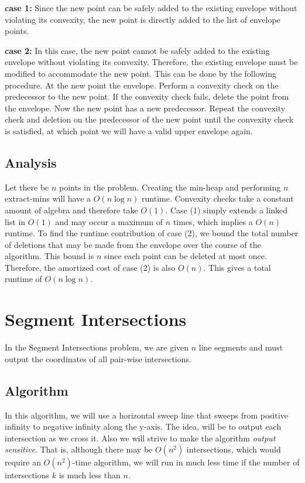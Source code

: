 \documentclass{article}
\begin{document}
{\bf case 1: } 
Since the new point can be safely added to the existing envelope without
violating its convexity, the new point is directly added to the list of
envelope points.

{\bf case 2: } In this case, the new point cannot be safely added to the
existing envelope without violating its convexity. Therefore, the existing
envelope must be modified to accommodate the new point.  This can be done by the
following procedure.  At the new point the envelope.  Perform a convexity check
on the predecessor to the new point.  If the convexity check fails, delete the
point from the envelope.  Now the new point has a new predecessor.  Repeat the
convexity check and deletion on the predecessor of the new point until the
convexity check is satisfied, at which point we will have a valid upper envelope
again.

\subsection{Analysis}

Let there be $n$ points in the problem.  Creating the min-heap and performing 
$n$ extract-mins will have a $O(n\log{n})$ runtime.  Convexity checks take a
constant amount of algebra and therefore take $O(1)$.  Case (1) simply 
extends a linked list in $O(1)$ and may occur a maximum of $n$ times, which
implies a $O(n)$ runtime.  To find the runtime contribution of case (2), we
bound the total number of deletions that may be made from the envelope over the
course of the algorithm.  This bound is $n$ since each point can be deleted at
most once.  Therefore, the amortized cost of case (2) is also $O(n)$. This
gives a total runtime of $O(n\log{n})$.


\section{Segment Intersections}

In the Segment Intersections problem, we are given $n$ line segments and must
output the coordinates of all pair-wise intersections.

\subsection{Algorithm}

In this algorithm, we will use a horizontal sweep line that sweeps from positive
infinity to negative infinity along the y-axis.  The idea, will be to 
output each intersection as we cross it.  Also we will strive to make the
algorithm {\em output sensitive}.  That is, although there may be $O(n^2)$
intersections, which would require an $O(n^2)$-time algorithm, we will run in
much less time if the number of intersections $k$ is much less than $n$.
\end{document}
